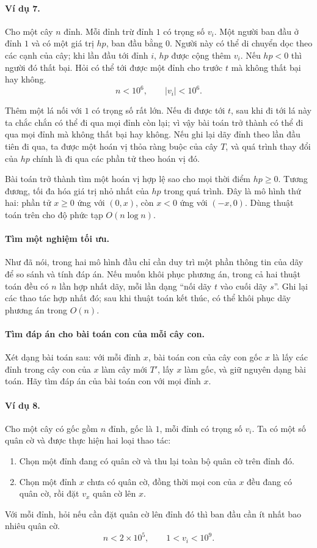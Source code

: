 \documentclass[11pt]{article}
\begin{document}
\paragraph{Ví dụ 7.}
Cho một cây $n$ đỉnh. Mỗi đỉnh trừ đỉnh $1$ có trọng số $v_i$. Một người ban đầu
ở đỉnh $1$ và có một giá trị $hp$, ban đầu bằng $0$. Người này có thể di chuyển
dọc theo các cạnh của cây; khi lần đầu tới đỉnh $i$, $hp$ được cộng thêm $v_i$.
Nếu $hp<0$ thì người đó thất bại. Hỏi có thể tới được một đỉnh cho trước $t$ mà
không thất bại hay không.
\[
  n<10^6,\qquad |v_i|<10^6.
\]

Thêm một lá nối với $1$ có trọng số rất lớn. Nếu đi được tới $t$, sau khi đi
tới lá này ta chắc chắn có thể đi qua mọi đỉnh còn lại; vì vậy bài toán trở
thành có thể đi qua mọi đỉnh mà không thất bại hay không. Nếu ghi lại dãy đỉnh
theo lần đầu tiên đi qua, ta được một hoán vị thỏa ràng buộc của cây $T$, và
quá trình thay đổi của $hp$ chính là đi qua các phần tử theo hoán vị đó.

Bài toán trở thành tìm một hoán vị hợp lệ sao cho mọi thời điểm $hp\ge 0$.
Tương đương, tối đa hóa giá trị nhỏ nhất của $hp$ trong quá trình. Đây là mô
hình thứ hai: phần tử $x\ge 0$ ứng với $(0,x)$, còn $x<0$ ứng với $(-x,0)$. Dùng
thuật toán trên cho độ phức tạp $O(n\log n)$.

\paragraph{Tìm một nghiệm tối ưu.}
Như đã nói, trong hai mô hình đầu chỉ cần duy trì một phần thông tin của dãy để
so sánh và tính đáp án. Nếu muốn khôi phục phương án, trong cả hai thuật toán
đều có $n$ lần hợp nhất dãy, mỗi lần dạng ``nối dãy $t$ vào cuối dãy $s$''. Ghi
lại các thao tác hợp nhất đó; sau khi thuật toán kết thúc, có thể khôi phục dãy
phương án trong $O(n)$.

\paragraph{Tìm đáp án cho bài toán con của mỗi cây con.}
Xét dạng bài toán sau: với mỗi đỉnh $x$, bài toán con của cây con gốc $x$ là
lấy các đỉnh trong cây con của $x$ làm cây mới $T'$, lấy $x$ làm gốc, và giữ
nguyên dạng bài toán. Hãy tìm đáp án của bài toán con với mọi đỉnh $x$.

\paragraph{Ví dụ 8.}
Cho một cây có gốc gồm $n$ đỉnh, gốc là $1$, mỗi đỉnh có trọng số $v_i$. Ta có
một số quân cờ và được thực hiện hai loại thao tác:
\begin{enumerate}
  \item Chọn một đỉnh đang có quân cờ và thu lại toàn bộ quân cờ trên đỉnh đó.
  \item Chọn một đỉnh $x$ chưa có quân cờ, đồng thời mọi con của $x$ đều đang có
  quân cờ, rồi đặt $v_x$ quân cờ lên $x$.
\end{enumerate}
Với mỗi đỉnh, hỏi nếu cần đặt quân cờ lên đỉnh đó thì ban đầu cần ít nhất bao
nhiêu quân cờ.
\[
  n<2\times 10^5,\qquad 1<v_i<10^9.
\]
\end{document}
